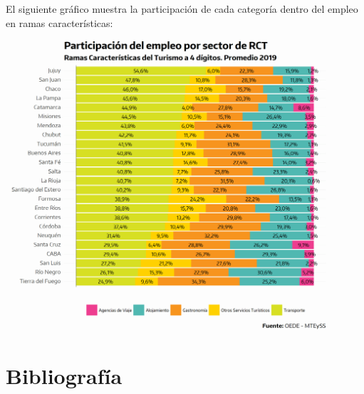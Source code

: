 \documentclass[
  openany]{book}
\begin{document}
El siguiente gráfico muestra la participación de cada categoría dentro del empleo en ramas características:

\begin{center}\includegraphics[width=1\linewidth]{imagenes/empleo.prov.part.agrup} \end{center}

\hypertarget{bibliografuxeda}{%
\chapter*{\texorpdfstring{\textbf{Bibliografía}}{Bibliografía}}\label{bibliografuxeda}}
\end{document}
